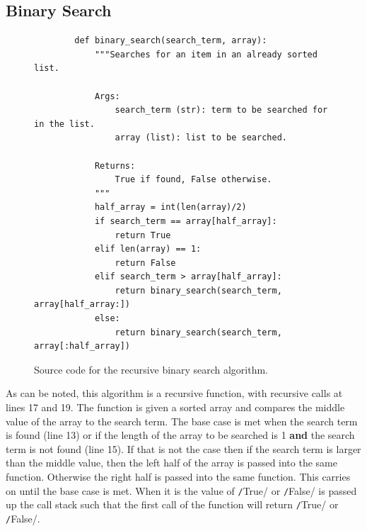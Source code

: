 \subsection{Binary Search}
\begin{figure}[H]
	\begin{verbatim}
		def binary_search(search_term, array):
			"""Searches for an item in an already sorted list.
	
			Args:
				search_term (str): term to be searched for in the list.
				array (list): list to be searched.
	
			Returns:
				True if found, False otherwise.
			"""
			half_array = int(len(array)/2)
			if search_term == array[half_array]:
				return True
			elif len(array) == 1:
				return False
			elif search_term > array[half_array]:
				return binary_search(search_term, array[half_array:])
			else:
				return binary_search(search_term, array[:half_array])
	\end{verbatim}
	\caption{Source code for the recursive binary search algorithm.}
\end{figure}

As can be noted, this algorithm is a recursive function, with recursive calls at lines 17 and 19. The function is given a sorted array and compares the middle value of the array to the search term. The base case is met when the search term is found (line 13) or if the length of the array to be searched is 1 \textbf{and} the search term is not found (line 15). If that is not the case then if the search term is larger than the middle value, then the left half of the array is passed into the same function. Otherwise the right half is passed into the same function. This carries on until the base case is met. When it is the value of \texttt/True/ or \texttt/False/ is passed up the call stack such that the first call of the function will return \texttt/True/ or \texttt/False/.
